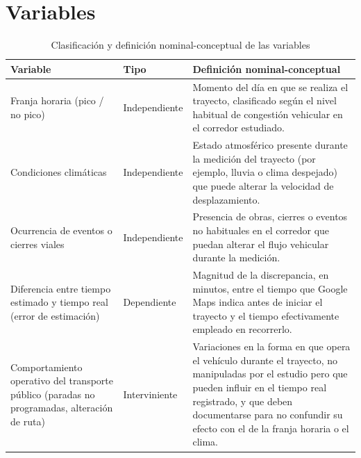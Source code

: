\section{Variables}

\begin{table}[htbp]
  \centering
  \caption{Clasificación y definición nominal-conceptual de las variables}
  \label{tab:variables}
  \renewcommand{\arraystretch}{1.5}
  \begin{tabular}{|p{4cm}|p{2.2cm}|p{8.3cm}|}
    \hline
    \textbf{Variable} & \textbf{Tipo} & \textbf{Definición nominal-conceptual} \\ \hline

    Franja horaria (pico / no pico)
    & Independiente
    & Momento del día en que se realiza el trayecto, clasificado según el nivel habitual de congestión vehicular en el corredor estudiado. \\ \hline

    Condiciones climáticas
    & Independiente
    & Estado atmosférico presente durante la medición del trayecto (por ejemplo, lluvia o clima despejado) que puede alterar la velocidad de desplazamiento. \\ \hline

    Ocurrencia de eventos o cierres viales
    & Independiente
    & Presencia de obras, cierres o eventos no habituales en el corredor que puedan alterar el flujo vehicular durante la medición. \\ \hline

    Diferencia entre tiempo estimado y tiempo real (error de estimación)
    & Dependiente
    & Magnitud de la discrepancia, en minutos, entre el tiempo que Google Maps indica antes de iniciar el trayecto y el tiempo efectivamente empleado en recorrerlo. \\ \hline

    Comportamiento operativo del transporte público (paradas no programadas, alteración de ruta)
    & Interviniente
    & Variaciones en la forma en que opera el vehículo durante el trayecto, no manipuladas por el estudio pero que pueden influir en el tiempo real registrado, y que deben documentarse para no confundir su efecto con el de la franja horaria o el clima. \\ \hline

  \end{tabular}
\end{table}
